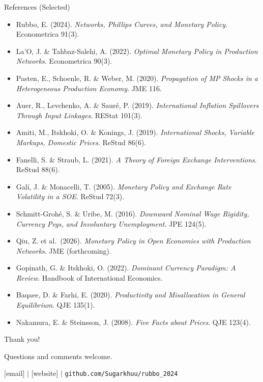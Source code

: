 \documentclass[aspectratio=169]{beamer}
\begin{document}
\begin{frame}{References (Selected)}
\small
\begin{itemize}
    \item Rubbo, E. (2024). \textit{Networks, Phillips Curves, and Monetary Policy}. Econometrica 91(3).
    \item La'O, J. \& Tahbaz-Salehi, A. (2022). \textit{Optimal Monetary Policy in Production Networks}. Econometrica 90(3).
    \item Pasten, E., Schoenle, R. \& Weber, M. (2020). \textit{Propagation of MP Shocks in a Heterogeneous Production Economy}. JME 116.
    \item Auer, R., Levchenko, A. \& Sauré, P. (2019). \textit{International Inflation Spillovers Through Input Linkages}. REStat 101(3).
    \item Amiti, M., Itskhoki, O. \& Konings, J. (2019). \textit{International Shocks, Variable Markups, Domestic Prices}. ReStud 86(6).
    \item Fanelli, S. \& Straub, L. (2021). \textit{A Theory of Foreign Exchange Interventions}. ReStud 88(6).
    \item Galí, J. \& Monacelli, T. (2005). \textit{Monetary Policy and Exchange Rate Volatility in a SOE}. ReStud 72(3).
    \item Schmitt-Grohé, S. \& Uribe, M. (2016). \textit{Downward Nominal Wage Rigidity, Currency Pegs, and Involuntary Unemployment}. JPE 124(5).
    \item Qiu, Z. et al.\ (2026). \textit{Monetary Policy in Open Economies with Production Networks}. JME (forthcoming).
    \item Gopinath, G. \& Itskhoki, O. (2022). \textit{Dominant Currency Paradigm: A Review}. Handbook of International Economics.
    \item Baqaee, D. \& Farhi, E. (2020). \textit{Productivity and Misallocation in General Equilibrium}. QJE 135(1).
    \item Nakamura, E. \& Steinsson, J. (2008). \textit{Five Facts about Prices}. QJE 123(4).
\end{itemize}
\end{frame}

\begin{frame}{}
\begin{center}
\Huge Thank you!

\vspace{1cm}
\normalsize Questions and comments welcome.

\vspace{0.5cm}
\small [email] $|$ [website] $|$ \texttt{github.com/Sugarkhuu/rubbo\_2024}
\end{center}
\end{frame}
\end{document}
